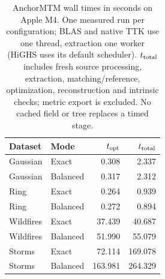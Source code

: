 \begin{table}[t]
\centering
\caption{AnchorMTM wall times in seconds on Apple M4. One measured run per configuration; BLAS and native TTK use one thread, extraction one worker (HiGHS uses its default scheduler). $t_{\rm total}$ includes fresh source processing, extraction, matching/reference, optimization, reconstruction and intrinsic checks; metric export is excluded. No cached field or tree replaces a timed stage.}
\label{tab:anchor-runtime-final}
\small
\begin{tabular}{llrr}
\toprule
Dataset & Mode & $t_{\rm opt}$ & $t_{\rm total}$ \\
\midrule
Gaussian & Exact & 0.308 & 2.337 \\
Gaussian & Balanced & 0.317 & 2.312 \\
Ring & Exact & 0.264 & 0.939 \\
Ring & Balanced & 0.272 & 0.894 \\
Wildfires & Exact & 37.439 & 40.687 \\
Wildfires & Balanced & 51.990 & 55.079 \\
Storms & Exact & 72.114 & 169.078 \\
Storms & Balanced & 163.981 & 264.329 \\
\bottomrule
\end{tabular}
\end{table}

